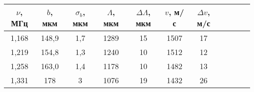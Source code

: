 \begin{tabular}{|c|c|c|c|c|c|c|c|c|c|c|}
\hline
$\nu$, МГц&$b$, мкм&$\sigma_b$, мкм&$\Lambda$, мкм&$\Delta \Lambda$, мкм&$v$, м/с&$\Delta v$, м/с\\
\hline
1,168&148,9&1,7&1289&15&1507&17\\
\hline
1,219&154,8&1,3&1240&10&1512&12\\
\hline
1,258&163,0&1,4&1178&10&1482&13\\
\hline
1,331&178&3&1076&19&1432&26\\
\hline
\end{tabular}